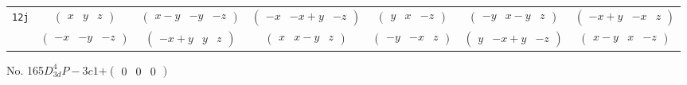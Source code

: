 \documentclass[fleqn,9pt,landscape]{jsarticle}
\begin{document}
\begin{center}
\begin{longtable}{ccccccc}
{\tt 12j} & $ \begin{pmatrix} x & y & z \end{pmatrix} $ & $ \begin{pmatrix} x - y & - y & - z \end{pmatrix} $ & $ \begin{pmatrix} - x & - x + y & - z \end{pmatrix} $ & $ \begin{pmatrix} y & x & - z \end{pmatrix} $ & $ \begin{pmatrix} - y & x - y & z \end{pmatrix} $ & $ \begin{pmatrix} - x + y & - x & z \end{pmatrix} $ \\
& $ \begin{pmatrix} - x & - y & - z \end{pmatrix} $ & $ \begin{pmatrix} - x + y & y & z \end{pmatrix} $ & $ \begin{pmatrix} x & x - y & z \end{pmatrix} $ & $ \begin{pmatrix} - y & - x & z \end{pmatrix} $ & $ \begin{pmatrix} y & - x + y & - z \end{pmatrix} $ & $ \begin{pmatrix} x - y & x & - z \end{pmatrix} $ \\
\end{longtable}
\end{center}
\newpage
No. 165\quad$D_{3d}^{4}$\quad$P-3c1$\quad[ trigonal ]\quad$+\begin{pmatrix} 0 & 0 & 0 \end{pmatrix}$
\end{document}
